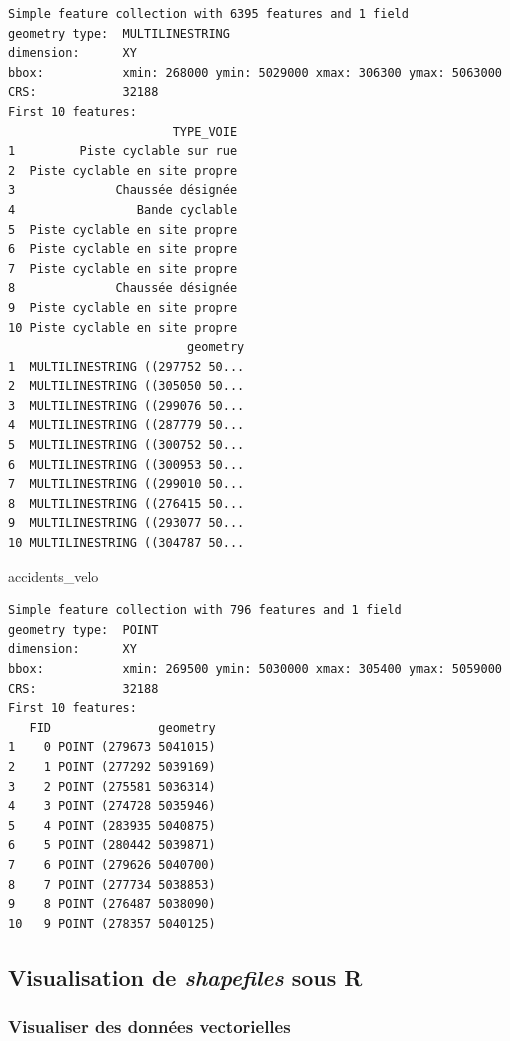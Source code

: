 \documentclass[
  12pt,
]{krantz}
\newenvironment{Shaded}{\begin{snugshade}}{\end{snugshade}}
\newcommand{\NormalTok}[1]{#1}
\begin{document}
\begin{verbatim}
Simple feature collection with 6395 features and 1 field
geometry type:  MULTILINESTRING
dimension:      XY
bbox:           xmin: 268000 ymin: 5029000 xmax: 306300 ymax: 5063000
CRS:            32188
First 10 features:
                       TYPE_VOIE
1         Piste cyclable sur rue
2  Piste cyclable en site propre
3              Chaussée désignée
4                 Bande cyclable
5  Piste cyclable en site propre
6  Piste cyclable en site propre
7  Piste cyclable en site propre
8              Chaussée désignée
9  Piste cyclable en site propre
10 Piste cyclable en site propre
                         geometry
1  MULTILINESTRING ((297752 50...
2  MULTILINESTRING ((305050 50...
3  MULTILINESTRING ((299076 50...
4  MULTILINESTRING ((287779 50...
5  MULTILINESTRING ((300752 50...
6  MULTILINESTRING ((300953 50...
7  MULTILINESTRING ((299010 50...
8  MULTILINESTRING ((276415 50...
9  MULTILINESTRING ((293077 50...
10 MULTILINESTRING ((304787 50...
\end{verbatim}

\begin{Shaded}
\begin{Highlighting}[]
\NormalTok{accidents_velo}
\end{Highlighting}
\end{Shaded}

\begin{verbatim}
Simple feature collection with 796 features and 1 field
geometry type:  POINT
dimension:      XY
bbox:           xmin: 269500 ymin: 5030000 xmax: 305400 ymax: 5059000
CRS:            32188
First 10 features:
   FID               geometry
1    0 POINT (279673 5041015)
2    1 POINT (277292 5039169)
3    2 POINT (275581 5036314)
4    3 POINT (274728 5035946)
5    4 POINT (283935 5040875)
6    5 POINT (280442 5039871)
7    6 POINT (279626 5040700)
8    7 POINT (277734 5038853)
9    8 POINT (276487 5038090)
10   9 POINT (278357 5040125)
\end{verbatim}

\hypertarget{visualisation-de-shapefiles-sous-r}{%
\subsection{\texorpdfstring{Visualisation de \emph{shapefiles} sous R}{Visualisation de shapefiles sous R}}\label{visualisation-de-shapefiles-sous-r}}

\hypertarget{visualiser-des-donnuxe9es-vectorielles}{%
\subsubsection*{Visualiser des données vectorielles}\label{visualiser-des-donnuxe9es-vectorielles}}
\end{document}
